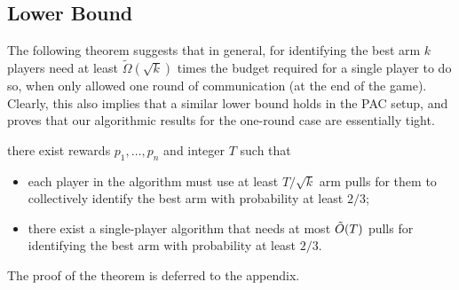 





\subsection{Lower Bound} \label{sec:lower bound}


The following theorem suggests that in general, for identifying the best arm $k$ players need at least $\tilde{\Omega}(\sqrt{k})$ times the budget required for a single player to do so, when only allowed one round of communication (at the end of the game). 
Clearly, this also implies that a similar lower bound holds in the PAC setup, and proves that our algorithmic results for the one-round case are essentially tight.    


\begin{theorem} \label{thm:lb1}
there exist rewards $p_1,\ldots,p_n$ and integer $T$ such that
\begin{itemize}
\item
each player in the algorithm must use at least $T/\sqrt{k}$ arm pulls for
them to collectively identify the best arm with probability at least $2/3$;
\item
there exist a single-player algorithm that needs at most $\tilde{O}(T)$ pulls for
identifying the best arm with probability at least $2/3$.
\end{itemize}
\end{theorem}


The proof of the theorem is deferred to the appendix.



